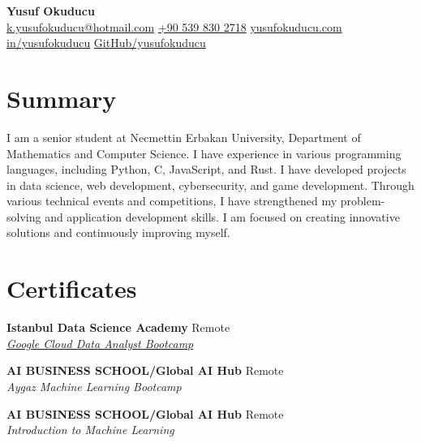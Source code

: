 \documentclass[10pt,a4paper]{extarticle}
\begin{document}
\begin{center}
    \begin{minipage}{\textwidth}
        \centering
        {\LARGE\textbf{Yusuf Okuducu}}\\[20pt]
        \href{mailto:k.yusufokuducu@hotmail.com}{k.yusufokuducu@hotmail.com} \quad
        \href{tel:+905398302718}{+90 539 830 2718} \quad
        \href{https://yusufokuducu.com}{yusufokuducu.com} \quad
        \href{https://linkedin.com/in/yusufokuducu}{in/yusufokuducu} \quad
        \href{https://github.com/yusufokuducu}{GitHub/yusufokuducu}
    \end{minipage}
\end{center}

\vspace{10pt}

\section{Summary}
I am a senior student at Necmettin Erbakan University, Department of Mathematics
and Computer Science. I have experience in various programming languages,
including Python, C, JavaScript, and Rust. I have developed projects in data science,
web development, cybersecurity, and game development. Through various technical
events and competitions, I have strengthened my problem-solving and application
development skills. I am focused on creating innovative solutions and continuously
improving myself.

\vspace{10pt}

\section{Certificates}
\textbf{Istanbul Data Science Academy} \hfill Remote\\
\textit{\href{https://istdatascience.com/certificate/DABYO237.pdf}{Google Cloud Data Analyst Bootcamp}}

\vspace{5pt}
\noindent\textbf{AI BUSINESS SCHOOL/Global AI Hub} \hfill Remote\\
\textit{Aygaz Machine Learning Bootcamp}

\vspace{5pt}
\noindent\textbf{AI BUSINESS SCHOOL/Global AI Hub} \hfill Remote\\
\textit{Introduction to Machine Learning}

\vspace{10pt}
\end{document}
